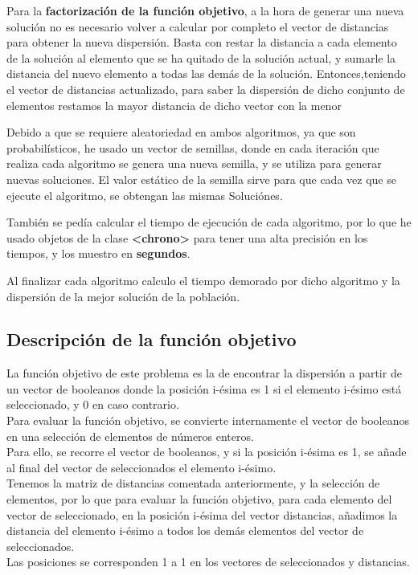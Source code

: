 \documentclass{article}
\begin{document}
Para la \textbf{factorización de la función objetivo}, a la hora de generar una nueva solución no
es necesario volver a calcular por completo el vector de distancias para obtener la nueva
dispersión. Basta con restar la distancia a cada elemento de la solución al elemento que 
se ha quitado de la solución actual, y sumarle la distancia del nuevo elemento a todas las demás 
de la solución.
\newline Entonces,teniendo el vector de distancias actualizado, para saber la dispersión de dicho conjunto 
de elementos restamos la mayor distancia de dicho vector con la menor

\vspace{5mm}

Debido a que se requiere aleatoriedad en ambos algoritmos, ya que son probabilísticos, he usado un vector de semillas, 
donde en cada iteración que 
realiza cada algoritmo se genera una nueva semilla, y se utiliza para generar nuevas soluciones.
El valor estático de la semilla sirve para que cada vez que se ejecute el algoritmo, se obtengan las mismas Soluciónes.

También se pedía calcular el tiempo de ejecución de cada algoritmo, por lo que he usado objetos de la clase 
\textbf{<chrono>} para tener una alta precisión en los tiempos, y los muestro en \textbf{segundos}.

\vspace{5mm}

Al finalizar cada algoritmo calculo el tiempo demorado por dicho algoritmo y la dispersión de la 
mejor solución de la población.

\subsection{\large Descripción de la función objetivo}
La función objetivo de este problema es la de encontrar la dispersión a partir de un vector de 
booleanos donde la posición i-ésima es 1 si el elemento i-ésimo está seleccionado, y 0 en caso contrario.\\
Para evaluar la función objetivo, se convierte internamente el vector de booleanos en una selección 
de elementos de números enteros.\\
Para ello, se recorre el vector de booleanos, y si la posición i-ésima es 1, se añade al final del vector de 
seleccionados el elemento i-ésimo.\\
Tenemos la matriz de distancias comentada anteriormente, y la selección de elementos, por lo
que para evaluar la función objetivo, para cada elemento del vector de seleccionado, en la posición i-ésima
del vector distancias, añadimos la distancia del elemento i-ésimo a todos los demás elementos del vector de seleccionados.\\
Las posiciones se corresponden 1 a 1 en los vectores de seleccionados y distancias.
\vspace{5mm}
\end{document}
